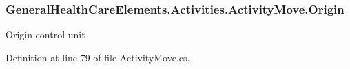 \subsubsection[{\texorpdfstring{Origin}{Origin}}]{ General\+Health\+Care\+Elements.\+Activities.\+Activity\+Move.\+Origin\hspace{0.3cm}{\ttfamily [get]}}\hypertarget{class_general_health_care_elements_1_1_activities_1_1_activity_move_a81c380ae109bc7de9f96717ad2c9ea5d}{}\label{class_general_health_care_elements_1_1_activities_1_1_activity_move_a81c380ae109bc7de9f96717ad2c9ea5d}


Origin control unit 



Definition at line 79 of file Activity\+Move.\+cs.

